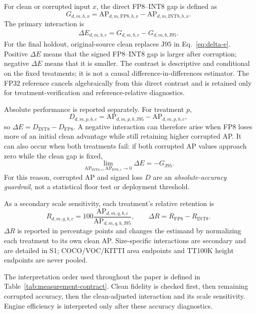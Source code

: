\documentclass[a4paper,fleqn]{cas-dc}
\newcommand{\AP}{\mathrm{AP}}
\newcommand{\Jclean}{\mathrm{J95}}
\begin{document}
For clean or corrupted input $x$, the direct FP8--INT8 gap is defined as
\begin{equation}
G_{d,m,b,x}=\AP_{d,m,\mathrm{FP8},b,x}-\AP_{d,m,\mathrm{INT8},b,x}.
\end{equation}
The primary interaction is
\begin{align}
\Delta E_{d,m,b,c}=G_{d,m,b,c}-G_{d,m,b,\Jclean}.
\label{eq:delta-e}
\end{align}
For the final holdout, original-source clean replaces $\Jclean$ in Eq.~\eqref{eq:delta-e}. Positive $\Delta E$ means that the signed FP8--INT8 gap is larger after corruption; negative $\Delta E$ means that it is smaller. The contrast is descriptive and conditional on the fixed treatments; it is not a causal difference-in-differences estimator. The FP32 reference cancels algebraically from this direct contrast and is retained only for treatment-verification and reference-relative diagnostics.

Absolute performance is reported separately. For treatment $p$,
\begin{equation}
D_{d,m,p,b,c}=\AP_{d,m,p,b,\Jclean}-\AP_{d,m,p,b,c},
\label{eq:d}
\end{equation}
so $\Delta E=D_{\mathrm{INT8}}-D_{\mathrm{FP8}}$. A negative interaction can therefore arise when FP8 loses more of an initial clean advantage while still retaining higher corrupted AP. It can also occur when both treatments fail: if both corrupted AP values approach zero while the clean gap is fixed,
\begin{equation}
\lim_{\AP_{\mathrm{INT8},c},\AP_{\mathrm{FP8},c}\to0}\Delta E=-G_{\Jclean}.
\label{eq:floor-limit}
\end{equation}
For this reason, corrupted AP and signed loss $D$ are an \emph{absolute-accuracy guardrail}, not a statistical floor test or deployment threshold.

As a secondary scale sensitivity, each treatment's relative retention is
\begin{equation}
R_{d,m,q,b,c}=100\frac{\AP_{d,m,q,b,c}}{\AP_{d,m,q,b,\Jclean}},\qquad
\Delta R=R_{\mathrm{FP8}}-R_{\mathrm{INT8}}.
\label{eq:delta-r}
\end{equation}
$\Delta R$ is reported in percentage points and changes the estimand by normalizing each treatment to its own clean AP. Size-specific interactions are secondary and are detailed in S1; COCO/VOC/KITTI area endpoints and TT100K height endpoints are never pooled.

The interpretation order used throughout the paper is defined in Table~\ref{tab:measurement-contract}. Clean fidelity is checked first, then remaining corrupted accuracy, then the clean-adjusted interaction and its scale sensitivity. Engine efficiency is interpreted only after these accuracy diagnostics.
\end{document}
